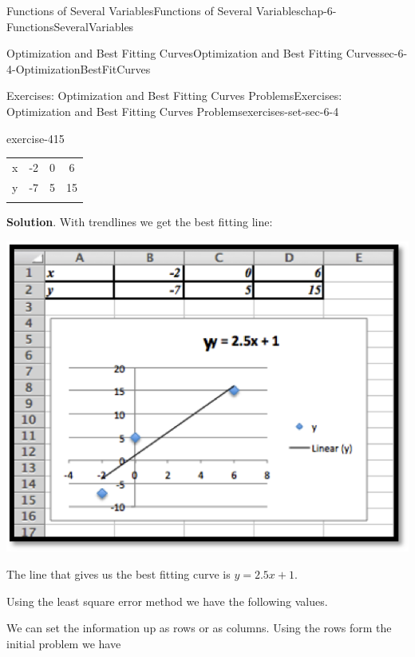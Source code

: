\documentclass[oneside,10pt,]{book}
\numberwithin{equation}{section}
\newcommand{\hrulethin}  {\noalign{\hrule height 0.04em}}
\newcommand{\hrulethick} {\noalign{\hrule height 0.11em}}
\begin{document}
\begin{chapterptx}{Functions of Several Variables}{}{Functions of Several Variables}{}{}{chap-6-FunctionsSeveralVariables}
\begin{sectionptx}{Optimization and Best Fitting Curves}{}{Optimization and Best Fitting Curves}{}{}{sec-6-4-OptimizationBestFitCurves}
\begin{exercises-subsection-numberless}{Exercises: Optimization and Best Fitting Curves Problems}{}{Exercises: Optimization and Best Fitting Curves Problems}{}{}{exercises-set-sec-6-4}
\begin{divisionexercise}{1}{}{}{exercise-415}
\begin{sidebyside}{1}{0}{0}{0}
\begin{sbspanel}{1}
{\centering%
\begin{tabular}{cccc}\hrulethick
x&-2&0&6\tabularnewline\hrulethin
y&-7&5&15\tabularnewline\hrulethin
\end{tabular}
\par}
\end{sbspanel}%
\end{sidebyside}%
\par\smallskip%
\noindent\textbf{Solution}.\hypertarget{solution-210}{}\quad%
\hypertarget{p-2484}{}%
With trendlines we get the best fitting line:%
\begin{sidebyside}{1}{0.2}{0.2}{0}%
\begin{sbspanel}{0.6}%
\includegraphics[width=1\linewidth]{images/sec6-4-sol1a.png}
\end{sbspanel}%
\end{sidebyside}%
\par
\hypertarget{p-2485}{}%
The line that gives us the best fitting curve is \(y=2.5 x+1\).%
\par
\hypertarget{p-2486}{}%
Using the least square error method we have the following values.%
\par
\hypertarget{p-2487}{}%
We can set the information up as rows or as columns. Using the rows form the initial problem we have%
\begin{sidebyside}{1}{0.1}{0.1}{0}%
\begin{sbspanel}{0.8}%

\end{sbspanel}
\end{sidebyside}
\end{divisionexercise}
\end{exercises-subsection-numberless}
\end{sectionptx}
\end{chapterptx}
\end{document}
